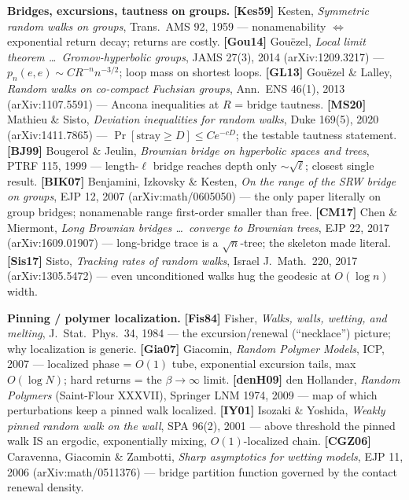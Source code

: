 \documentclass[11pt]{article}
\begin{document}
\textbf{Bridges, excursions, tautness on groups.}
\textbf{[Kes59]} Kesten, \emph{Symmetric random walks on groups}, Trans.\ AMS 92, 1959 ---
nonamenability $\Leftrightarrow$ exponential return decay; returns are costly.
\textbf{[Gou14]} Gou\"ezel, \emph{Local limit theorem \dots\ Gromov-hyperbolic groups}, JAMS 27(3), 2014
(arXiv:1209.3217) --- $p_n(e,e)\sim CR^{-n}n^{-3/2}$; loop mass on shortest loops.
\textbf{[GL13]} Gou\"ezel \& Lalley, \emph{Random walks on co-compact Fuchsian groups}, Ann.\ ENS 46(1),
2013 (arXiv:1107.5591) --- Ancona inequalities at $R$ = bridge tautness.
\textbf{[MS20]} Mathieu \& Sisto, \emph{Deviation inequalities for random walks}, Duke 169(5), 2020
(arXiv:1411.7865) --- $\Pr[\text{stray}\ge D]\le Ce^{-cD}$; the testable tautness statement.
\textbf{[BJ99]} Bougerol \& Jeulin, \emph{Brownian bridge on hyperbolic spaces and trees}, PTRF 115,
1999 --- length-$\ell$ bridge reaches depth only $\sim\sqrt\ell$; closest single result.
\textbf{[BIK07]} Benjamini, Izkovsky \& Kesten, \emph{On the range of the SRW bridge on groups}, EJP 12,
2007 (arXiv:math/0605050) --- the only paper literally on group bridges; nonamenable range first-order
smaller than free.
\textbf{[CM17]} Chen \& Miermont, \emph{Long Brownian bridges \dots\ converge to Brownian trees}, EJP 22,
2017 (arXiv:1609.01907) --- long-bridge trace is a $\sqrt n$-tree; the skeleton made literal.
\textbf{[Sis17]} Sisto, \emph{Tracking rates of random walks}, Israel J.\ Math.\ 220, 2017
(arXiv:1305.5472) --- even unconditioned walks hug the geodesic at $O(\log n)$ width.

\textbf{Pinning / polymer localization.}
\textbf{[Fis84]} Fisher, \emph{Walks, walls, wetting, and melting}, J.\ Stat.\ Phys.\ 34, 1984 --- the
excursion/renewal (``necklace'') picture; why localization is generic.
\textbf{[Gia07]} Giacomin, \emph{Random Polymer Models}, ICP, 2007 --- localized phase = $O(1)$ tube,
exponential excursion tails, max $O(\log N)$; hard returns = the $\beta\to\infty$ limit.
\textbf{[denH09]} den Hollander, \emph{Random Polymers} (Saint-Flour XXXVII), Springer LNM 1974, 2009
--- map of which perturbations keep a pinned walk localized.
\textbf{[IY01]} Isozaki \& Yoshida, \emph{Weakly pinned random walk on the wall}, SPA 96(2), 2001 ---
above threshold the pinned walk IS an ergodic, exponentially mixing, $O(1)$-localized chain.
\textbf{[CGZ06]} Caravenna, Giacomin \& Zambotti, \emph{Sharp asymptotics for wetting models}, EJP 11,
2006 (arXiv:math/0511376) --- bridge partition function governed by the contact renewal density.
\end{document}
